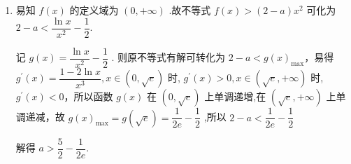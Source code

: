 \begin{enumerate}
\begin{jieda}
\begin{enumerate}
            所以函数 $f\left( x\right)$ 在 $\left( {\dfrac{1}{2},1}\right)$ 上单调递增,在$(1,4)$上单调递减，所以当 $x = 1$ 时, $f\left( x\right)$ 取得最大值. 最大值为 $f\left( 1\right)  =  - \dfrac{1}{2}$，又 $f\left( \dfrac{1}{2}\right)  = \ln \dfrac{1}{2} - \dfrac{1}{8} =  - \ln 2 - \dfrac{1}{8},f\left( 4\right)  = 2\ln 2 - 8$
            
            $f\left( \dfrac{1}{2}\right)  - f\left( 4\right)  =  - 3\ln 2 - \dfrac{1}{8} + 8 >  - 3 - \dfrac{1}{8} + 8 > 0.$
            
            所以 $f\left( \dfrac{1}{2}\right)  > f\left( 4\right)$ . 所以当 $x = 4$ 时, $f\left( x\right)$ 取得最小值. 最小值为 $f\left( 4\right)  = 2\ln 2 - 8$
            
            故 $f\left( x\right)$ 在 $\left\lbrack  {\dfrac{1}{2},4}\right\rbrack$ 上的最大值为 $- \dfrac{1}{2}$ . 最小值为 $2\ln 2 - 8$.
            
            \item 易知 $f\left( x\right)$ 的定义域为 $\left( {0, + \infty }\right)$ .故不等式 $f\left( x\right)  > \left( {2 - a}\right) {x}^{2}$ 可化为 $2 - a < \dfrac{\ln x}{{x}^{2}} - \dfrac{1}{2}$.
            
            记 $g\left( x\right)  = \dfrac{\ln x}{{x}^{2}} - \dfrac{1}{2}$ . 则原不等式有解可转化为 $2 - a < g{\left( x\right) }_{\max }$，易得 ${g}^{\prime }\left( x\right)  = \dfrac{1 - 2\ln x}{{x}^{3}},x \in  \left( {0,\sqrt{{e}}}\right)$ 时, ${g}^{\prime }\left( x\right)  > 0,x \in  \left( {\sqrt{{e}}, + \infty }\right)$ 时, ${g}^{\prime }\left( x\right)  < 0$，所以函数 $g\left( x\right)$ 在 $\left( {0,\sqrt{{e}}}\right)$ 上单调递增,在 $\left( {\sqrt{{e}}, + \infty }\right)$ 上单调递减，故 $g{\left( x\right) }_{\max } = g\left( \sqrt{{e}}\right)  = \dfrac{1}{2{e}} - \dfrac{1}{2}$ ,所以 $2 - a < \dfrac{1}{2{e}} - \dfrac{1}{2}$
            
            解得 $a > \dfrac{5}{2} - \dfrac{1}{2{e}}$.
        \end{enumerate}
    \end{jieda}


\end{enumerate}
